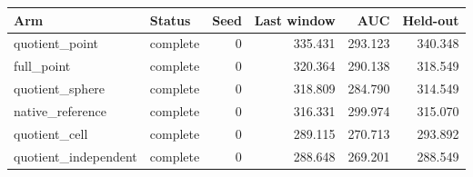 \begin{tabular}{llrrrr}
Arm & Status & Seed & Last window & AUC & Held-out \\
\hline
quotient\_point & complete & 0 & 335.431 & 293.123 & 340.348 \\
full\_point & complete & 0 & 320.364 & 290.138 & 318.549 \\
quotient\_sphere & complete & 0 & 318.809 & 284.790 & 314.549 \\
native\_reference & complete & 0 & 316.331 & 299.974 & 315.070 \\
quotient\_cell & complete & 0 & 289.115 & 270.713 & 293.892 \\
quotient\_independent & complete & 0 & 288.648 & 269.201 & 288.549 \\
\end{tabular}
